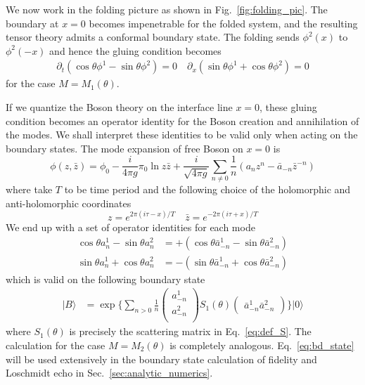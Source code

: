We now work in the folding picture as shown in Fig.~\ref{fig:folding_pic}. The boundary at $x=0$ becomes impenetrable for the folded system, and the resulting tensor theory admits a conformal boundary state. The folding sends $\phi^2(x)$ to $\phi^2(-x)$ and hence the gluing condition becomes
\begin{equation}
\begin{aligned}
\partial_t(\cos\theta\phi^1-\sin\theta\phi^2)=0 \quad
\partial_x(\sin\theta\phi^1+\cos\theta\phi^2)=0 
\end{aligned}
\end{equation}
for the case $M = M_1(\theta)$. 

If we quantize the Boson theory on the interface line $x = 0$, these gluing condition becomes an operator identity for the Boson creation and annihilation of the modes. We shall interpret these identities to be valid only when acting on the boundary states. The mode expansion of free Boson on $x = 0$\cite{di_francesco_conformal_1997} is
\begin{equation}
\phi(z, \bar{z} ) = \phi_0 - \frac{i}{4\pi g } \pi_0 \ln z \bar{z}  + \frac{i}{\sqrt{4\pi g} } \sum_{n \ne 0 } \frac{1}{n} \left(a_n z^n - \bar{a}_{-n } \bar{z}^{-n}   \right)
\end{equation}
where take $T$ to be time period and the following choice of the holomorphic and anti-holomorphic coordinates
\begin{equation}
z= e^{ 2\pi ( i\tau - x ) / T } \quad \bar{z} = e^{ -2\pi ( i\tau + x ) / T }
\end{equation}
We end up with a set of operator identities for each mode
\begin{equation}
\begin{aligned}
\label{eq:rotation_a_basis}
\cos\theta a_n^1-\sin\theta a_n^2 &= +( \cos\theta\bar{a}_{-n}^1-\sin\theta \bar{a}_{-n}^2 ) \\
\sin\theta a_n^1+\cos\theta a_n^2 &= -( \sin\theta\bar{a}_{-n}^1+\cos\theta \bar{a}_{-n}^2 ) 
\end{aligned}
\end{equation}
which is valid on the following boundary state
\begin{equation}
\label{eq:bd_state}
\begin{aligned}
| B \rangle 
& =  \exp\Big\{ \sum_{n > 0 } \frac{1}{n}
\begin{pmatrix}
a_{-n}^1\\
a_{-n}^2\\                              
\end{pmatrix}
S_1( \theta )
\begin{pmatrix}
\bar{a}_{-n}^1  \bar{a}_{-n}^2
\end{pmatrix} \Big\} |0\rangle
\end{aligned}
\end{equation}
where $S_1(\theta) $ is precisely the scattering matrix in Eq.~\eqref{eq:def_S}. The calculation for the case $M=M_2(\theta)$ is completely analogous. Eq.~\eqref{eq:bd_state} will be used extensively in the boundary state calculation of fidelity and Loschmidt echo in Sec.~\ref{sec:analytic_numerics}. 


